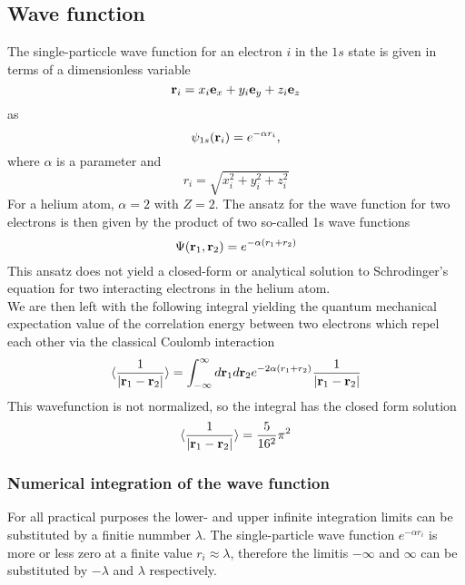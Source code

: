 \documentclass[%
reprint,
amsmath,amssymb,
aps,
]{revtex4-1}
\begin{document}
\subsection{Wave function} \noindent 
The single-particcle wave function for an electron $i$ in the $1s$ state is given in terms of a dimensionless variable 
\begin{equation*}
	 {\bf r}_i =  x_i {\bf e}_x + y_i {\bf e}_y +z_i {\bf e}_z 
\end{equation*}
as 
\begin{equation*}
	\psi_{1s}({\bf r}_i)  =   e^{-\alpha r_i},
\end{equation*}
where $\alpha$ is a parameter and 
\begin{equation*}
	r_i = \sqrt{x_i^2+y_i^2+z_i^2}
\end{equation*}
For a helium atom, $\alpha = 2$ with $Z = 2$. The ansatz for the wave function for two electrons is then given by the product of two so-called 1s wave functions
\begin{equation*}
	\Psi({\bf r}_1,{\bf r}_2)  =   e^{-\alpha (r_1+r_2)}
\end{equation*}
This ansatz does not yield a closed-form or analytical solution to Schrodinger's equation for two interacting electrons in the helium atom. \\
We are then left with the following integral yielding the quantum mechanical expectation value of the correlation energy between two electrons which repel each other via the classical Coulomb interaction
\begin{equation}
	   \langle \frac{1}{|{\bf r}_1-{\bf r}_2|} \rangle =
	\int_{-\infty}^{\infty} d{\bf r}_1d{\bf r}_2  e^{-2\alpha (r_1+r_2)}\frac{1}{|{\bf r}_1-{\bf r}_2|}
\end{equation}
This wavefunction is not normalized, so the integral has the closed form solution 
\begin{equation}
\langle \frac{1}{|{\bf r}_1-{\bf r}_2|} \rangle = \dfrac{5}{16^2}\pi^2
\end{equation}
\subsubsection*{Numerical integration of the wave function}
For all practical purposes the lower- and upper infinite integration limits can be substituted by a finitie nummber $\lambda$. The single-particle wave function $e^{-\alpha r_i}$ is more or less zero at a finite value $r_i\approx \lambda$, therefore the limitis $-\infty$ and $\infty$ can be substituted by $-\lambda$ and $\lambda$ respectively. 
\vspace{10mm}
\end{document}
